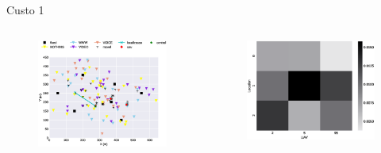 \begin{frame}{Custo 1}
        \begin{columns}
            \begin{column}{0.65\textwidth}
               \begin{figure}[!htb]
                    \includegraphics[width=\textwidth]{custo_1/980_uav_loc.eps}
                \end{figure}
            \end{column}
            \begin{column}{0.45\textwidth}
               \begin{figure}[!htb]
                    \includegraphics[width=\textwidth]{custo_1/980_bij_.eps}

\end{figure}
\end{column}
\end{columns}
\end{frame}
